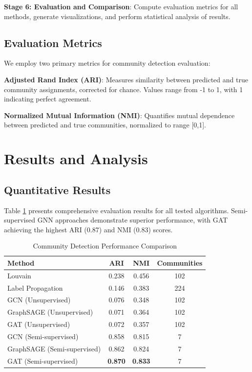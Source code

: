 \documentclass[conference]{IEEEtran}
\begin{document}
\textbf{Stage 6: Evaluation and Comparison}: Compute evaluation metrics for all methods, generate visualizations, and perform statistical analysis of results.

\subsection{Evaluation Metrics}

We employ two primary metrics for community detection evaluation:

\textbf{Adjusted Rand Index (ARI)}: Measures similarity between predicted and true community assignments, corrected for chance. Values range from -1 to 1, with 1 indicating perfect agreement.

\textbf{Normalized Mutual Information (NMI)}: Quantifies mutual dependence between predicted and true communities, normalized to range [0,1].

\section{Results and Analysis}

\subsection{Quantitative Results}

Table \ref{tab:results} presents comprehensive evaluation results for all tested algorithms. Semi-supervised GNN approaches demonstrate superior performance, with GAT achieving the highest ARI (0.87) and NMI (0.83) scores.

\begin{table}[htbp]
\caption{Community Detection Performance Comparison}
\begin{center}
\begin{tabular}{|l|c|c|c|}
\hline
\textbf{Method} & \textbf{ARI} & \textbf{NMI} & \textbf{Communities} \\
\hline\hline
Louvain & 0.238 & 0.456 & 102 \\
Label Propagation & 0.146 & 0.383 & 224 \\
\hline
GCN (Unsupervised) & 0.076 & 0.348 & 102 \\
GraphSAGE (Unsupervised) & 0.071 & 0.364 & 102 \\
GAT (Unsupervised) & 0.072 & 0.357 & 102 \\
\hline
GCN (Semi-supervised) & 0.858 & 0.815 & 7 \\
GraphSAGE (Semi-supervised) & 0.862 & 0.824 & 7 \\
GAT (Semi-supervised) & \textbf{0.870} & \textbf{0.833} & 7 \\
\hline
\end{tabular}
\end{center}
\label{tab:results}
\end{table}
\end{document}
